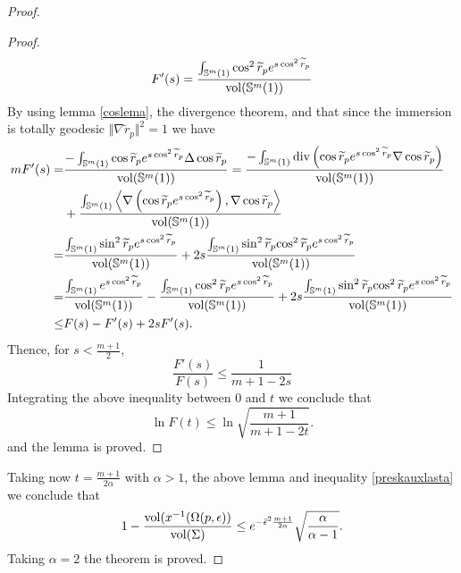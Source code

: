 \documentclass{amsart}
\theoremstyle{definition}
\theoremstyle{remark}
\begin{document}
\begin{proof}
\begin{proof}
    $$
F'(s)=\frac{\int_{\mathbb{S}^m(1)}\cos^2\widetilde{r}_pe^{s \cos^2\widetilde{r}_p}}{{\rm vol}(\mathbb{S}^m(1))}
    $$
 By using lemma \ref{coslema}, the divergence theorem, and that since the immersion is totally geodesic $\Vert \nabla\widetilde{r}_p\Vert^2=1$ we have 
 $$
\begin{aligned}
mF'(s)=&\frac{-\int_{\mathbb{S}^m(1)}\cos\widetilde{r}_pe^{s \cos^2\widetilde{r}_p}\Delta \cos\widetilde{r}_p}{{\rm vol}(\mathbb{S}^m(1))}
=\frac{-\int_{\mathbb{S}^m(1)}{\rm div}\left(\cos\widetilde{r}_pe^{s \cos^2\widetilde{r}_p}\nabla \cos\widetilde{r}_p\right)}{{\rm vol}(\mathbb{S}^m(1))}\\&+\frac{\int_{\mathbb{S}^m(1)}\left\langle\nabla \left(\cos\widetilde{r}_pe^{s \cos^2\widetilde{r}_p}\right),\nabla \cos\widetilde{r}_p\right\rangle}{{\rm vol}(\mathbb{S}^m(1))}\\
=&\frac{\int_{\mathbb{S}^m(1)}\sin^2\widetilde{r}_pe^{s \cos^2\widetilde{r}_p}}{{\rm vol}(\mathbb{S}^m(1))}+2s\frac{\int_{\mathbb{S}^m(1)}\sin^2\widetilde{r}_p{ \cos^2\widetilde{r}_p}e^{s \cos^2\widetilde{r}_p}}{{\rm vol}(\mathbb{S}^m(1))}\\
=&\frac{\int_{\mathbb{S}^m(1)}e^{s \cos^2\widetilde{r}_p}}{{\rm vol}(\mathbb{S}^m(1))}-\frac{\int_{\mathbb{S}^m(1)}\cos^2\widetilde{r}_pe^{s \cos^2\widetilde{r}_p}}{{\rm vol}(\mathbb{S}^m(1))}+2s\frac{\int_{\mathbb{S}^m(1)}\sin^2\widetilde{r}_p{ \cos^2\widetilde{r}_p}e^{s \cos^2\widetilde{r}_p}}{{\rm vol}(\mathbb{S}^m(1))}\\
\leq & F(s)-F'(s)+2sF'(s).
    \end{aligned}
 $$
 Thence, for $s<\frac{m+1}{2}$,
 $$
\frac{F'(s)}{F(s)}\leq \frac{1}{m+1-2s}
 $$
 Integrating the above inequality between $0$ and $t$ we conclude that
 $$
\ln F(t)\leq \ln \sqrt{\frac{m+1}{m+1-2t}}.
 $$
 and the lemma is proved.
\end{proof}
Taking now $t=\frac{m+1}{2\alpha}$ with $\alpha>1$, the above lemma and inequality \eqref{preskauxlasta} we conclude that
\begin{equation}\label{lasta}
     1-\frac{{\rm vol}(x^{-1}(\Omega(p,\epsilon))}{{\rm vol}(\Sigma)}\leq e^{-\bar\epsilon^2\frac{m+1}{2\alpha}}\sqrt{\frac{\alpha}{\alpha-1}}.
\end{equation}
Taking $\alpha=2$ the theorem is proved.\end{proof}
\end{document}
